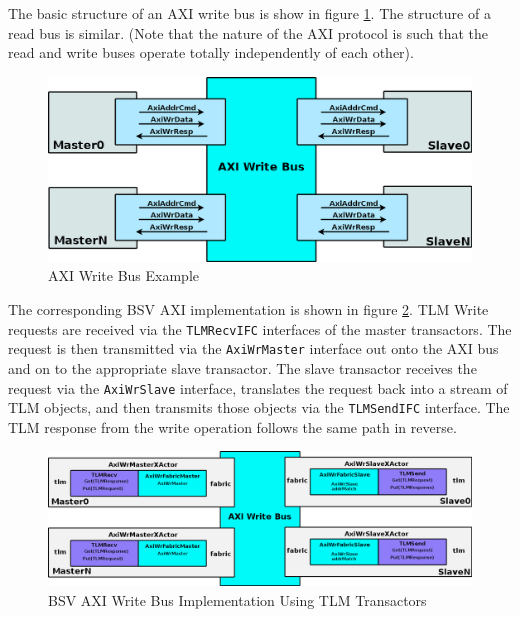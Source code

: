 \documentclass[twoside,letterpaper]{article}
\newcommand{\te}[1]{\texttt{#1}}
\begin{document}
 The basic structure of an AXI write bus is show in
figure \ref{AxiWrExample}. The structure of a read bus is similar. (Note
that the nature of the AXI protocol is such that the read and write
buses operate totally independently of each other).

\begin{figure}[ht]
\begin{center}
\includegraphics[height = 2 in]{AXIWrExample}
\caption{AXI Write Bus Example}
\label{AxiWrExample}
\end{center}
\end{figure}


The corresponding BSV AXI implementation is shown in figure
\ref{AxiWrTLM}.  TLM Write requests are received via the \te{TLMRecvIFC} 
interfaces of the master transactors. The request is then transmitted
via the \te{AxiWrMaster} interface out onto the AXI bus and on to the
appropriate slave transactor. The slave transactor receives the request via the
\te{AxiWrSlave} interface, translates the request back into a stream of 
TLM objects, and then transmits those objects via the \te{TLMSendIFC} 
interface. The TLM response from the write operation follows the 
same path in reverse.



\begin{figure}[ht]
\begin{center}
\includegraphics[width = 6 in]{AXIWrTLM}
\caption{BSV AXI Write Bus Implementation Using TLM Transactors}
\label{AxiWrTLM}
\end{center}
\end{figure}
\end{document}

